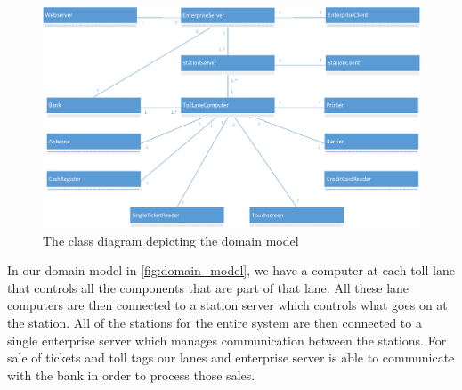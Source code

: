 \begin{figure}
\centering
\includegraphics[width=1\textwidth]{img/domain_model/domain_model}
\caption{The class diagram depicting the domain model}
\label{fig:domain_model}
\end{figure}

In our domain model in {\autoref{fig:domain_model}}, we have a computer at each toll lane that controls all the components that are part of that lane. All these lane computers are then connected to a station server which controls what goes on at the station. All of the stations for the entire system are then connected to a single enterprise server which manages communication between the stations. For sale of tickets and toll tags our lanes and enterprise server is able to communicate with the bank in order to process those sales.